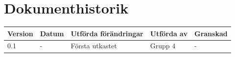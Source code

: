 \documentclass[11pt]{article}
\begin{document}
\tableofcontents

\pagebreak

\section*{Dokumenthistorik}
\begin{table}[h]
\begin{tabular}{|l|l|l|l|l|} \hline

\textbf{Version} & \textbf{Datum} & \textbf{Utförda förändringar} & \textbf{Utförda av} & \textbf{Granskad} \\ \hline
0.1 & - &  Första utkastet & Grupp 4 & - \\ \hline
\end{tabular}
\end{table}

\pagebreak
{}
\end{document}
